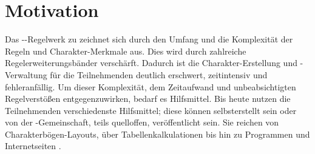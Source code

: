 \section{Motivation}\label{sec:motivation}

Das --Regelwerk zu  zeichnet sich \insb durch den Umfang und die Komplexität der Regeln und Charakter-Merkmale aus.
Dies wird durch zahlreiche Regelerweiterungsbänder verschärft.
Dadurch ist \uA die Charakter-Erstellung und -Verwaltung für die Teilnehmenden deutlich erschwert, zeitintensiv und fehleranfällig.
Um dieser Komplexität, dem Zeitaufwand und unbeabsichtigten Regelverstößen entgegenzuwirken, bedarf es Hilfsmittel.
Bis heute nutzen die Teilnehmenden verschiedenste Hilfsmittel;
diese können selbsterstellt sein oder von der -Gemeinschaft, teils quelloffen, veröffentlicht sein.
Sie reichen von Charakterbögen-Layouts, über Tabellenkalkulationen bis hin zu Programmen und Internetseiten .

